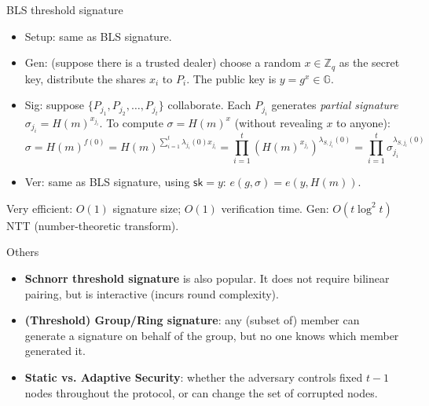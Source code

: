 \documentclass[10pt]{beamer}
\begin{document}
    

\begin{frame}{BLS threshold signature}
    \vspace{-0.5em}
\begin{itemize}
    \item Setup: same as BLS signature. 
    \item Gen: (suppose there is a trusted dealer) choose a random $x\in \mathbb{Z}_{q}$ as the secret key, distribute the shares $x_i$ to $P_i$. The public key is $y=g^x\in \mathbb{G}$. 
    \item Sig: suppose $\{P_{j_1}, P_{j_2},\dots, P_{j_t}\}$ collaborate. Each $P_{j_i}$ generates \textit{partial signature} $\sigma_{j_i}=H(m)^{x_{j_i}}$. To compute $\sigma = H(m)^{x}$ (without revealing $x$ to anyone):\vspace{-0.5em} 
    \begin{equation*}
        \sigma = H(m)^{f(0)} = H(m)^{\sum_{i=1}^t \lambda_{j_i}(0) x_{j_i}} = \prod_{i=1}^t (H(m)^{x_{j_i}})^{\lambda_{S, j_i}(0)} = \prod_{i=1}^t \sigma_{j_i}^{\lambda_{S, j_i}(0)}
    \end{equation*}
    \vspace{-0.3em}
    \item Ver: same as BLS signature, using $\mathsf{sk}=y$: $e(g, \sigma)=e(y, H(m))$. 
\end{itemize}
\vspace{0.5em}
\pause 
Very efficient: $O(1)$ signature size; $O(1)$ verification time. Gen: $O(t\log^2 t)$ NTT (number-theoretic transform). 
\end{frame}

\begin{frame}{Others}
    \begin{itemize}
        \item \textbf{Schnorr threshold signature} is also popular. It does not require bilinear pairing, but is interactive (incurs round complexity). 
        \item \textbf{(Threshold) Group/Ring signature}: any (subset of) member can generate a signature on behalf of the group, but no one knows which member generated it. 
        \item \textbf{Static vs. Adaptive Security}: whether the adversary controls fixed $t-1$ nodes throughout the protocol, or can change the set of corrupted nodes. 
    \end{itemize}
\end{frame}
\end{document}

